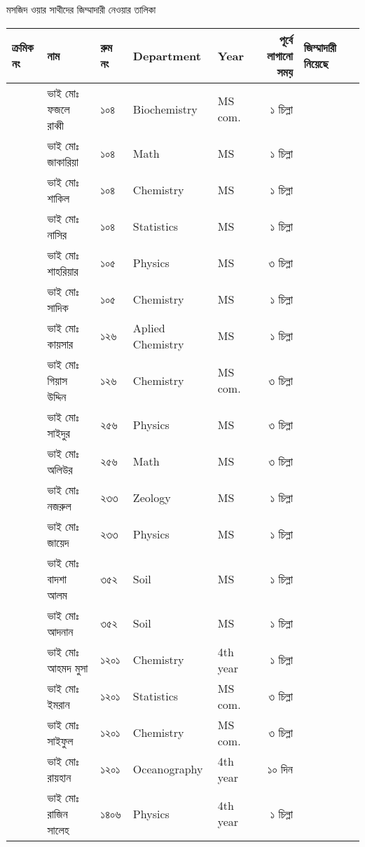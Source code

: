 \documentclass{article}
\newcounter{magicrownumbers}
\newcommand\rownumber{\stepcounter{magicrownumbers}\arabic{magicrownumbers}}
\begin{document}
\begin{center}
মসজিদ ওয়ার সাথীদের জিম্মাদারী নেওয়ার তালিকা
\end{center}
\noindent
\centering
\noindent
  \begin{tabular}{@{}lll
>{\selectlanguage{english}}l
>{\selectlanguage{english}}l
    r|p{4.5cm}r@{}}
\toprule
ক্রমিক নং &  নাম &  রুম নং &  Department & Year & পূর্বে লাগানো সময় & জিম্মাদারী নিয়েছে \\
\toprule
\rownumber & ভাই মোঃ ফজলে রাব্বী  & ১০৪ & Biochemistry & MS com. & ১ চিল্লা \\ 
\hline
\rownumber & ভাই মোঃ জাকারিয়া & ১০৪ & Math & MS & ১ চিল্লা \\
\hline
\rownumber & ভাই মোঃ শাকিল & ১০৪ & Chemistry & MS & ১ চিল্লা\\
\hline
\rownumber & ভাই মোঃ নাসির & ১০৪ & Statistics & MS & ১ চিল্লা\\
\hline
\rownumber & ভাই মোঃ শাহরিয়ার & ১০৫ & Physics & MS & ৩ চিল্লা \\
\hline
\rownumber & ভাই মোঃ সাদিক & ১০৫ & Chemistry & MS & ১ চিল্লা \\
\hline
\rownumber & ভাই মোঃ কায়সার & ১২৬ & Aplied Chemistry & MS & ১ চিল্লা \\ 
\hline
\rownumber & ভাই মোঃ গিয়াস উদ্দিন  & ১২৬ & Chemistry & MS com. & ৩ চিল্লা \\ 
\hline
\rownumber & ভাই মোঃ সাইদুর & ২৫৬ & Physics & MS & ৩ চিল্লা \\ 
\hline
\rownumber & ভাই মোঃ অলিউর & ২৫৬ & Math & MS & ৩ চিল্লা \\ 
\hline
\rownumber & ভাই মোঃ নজরুল  & ২৩৩ & Zeology & MS & ১ চিল্লা \\ 
\rownumber & ভাই মোঃ জায়েদ & ২৩৩ & Physics & MS & ১ চিল্লা \\ 
\hline
\rownumber & ভাই মোঃ বাদশা আলম & ৩৫২ & Soil & MS & ১ চিল্লা \\
\hline
\rownumber & ভাই মোঃ আদনান & ৩৫২ & Soil & MS & ১ চিল্লা \\
\hline
\rownumber & ভাই মোঃ আহমদ মুসা & ১২০১ & Chemistry & 4th year & ১ চিল্লা \\ 
\hline
\rownumber & ভাই মোঃ ইমরান & ১২০১ & Statistics & MS com. & ৩ চিল্লা \\ 
\hline
\rownumber & ভাই মোঃ সাইফুল & ১২০১ & Chemistry & MS com. & ৩ চিল্লা \\ 
\hline
\rownumber & ভাই মোঃ রায়হান  & ১২০১ & Oceanography & 4th year & ১০ দিন \\
\hline
\rownumber & ভাই মোঃ রাজিন সালেহ & ১৪০৬ & Physics & 4th year & ১ চিল্লা \\ 

\end{tabular}
\end{document}
